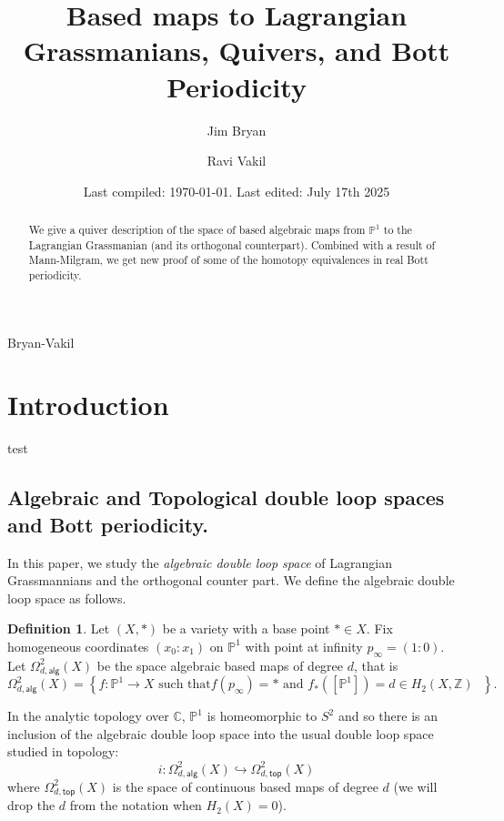 \documentclass{amsart}
\title{Based maps to Lagrangian Grassmanians, Quivers, and Bott Periodicity}
\date{Last compiled:  \today.  Last edited: July 17th 2025}
\author{Jim Bryan}
\author{Ravi Vakil}
\theoremstyle{definition}
\newtheorem{definition}[theorem]{Definition}
\newcommand{\CC} {{\mathbb C}}          %
\newcommand{\ZZ} {{\mathbb Z}}		%
\newcommand{\PP}{\mathbb{P}}
\newcommand{\alg}{\mathsf{alg}}
\renewcommand{\top}{\mathsf{top}}
\newcommand{\LoopTwo}{\Omega^{2}_{d,\alg}}
\newcommand{\LoopTwoTop}{\Omega^{2}_{d,\top}}
\begin{document}
\begin{abstract}
We give a quiver description of the space of based algebraic maps from
$\PP^{1}$ to the Lagrangian Grassmanian (and its orthogonal
counterpart). Combined with a result of Mann-Milgram, we get new proof of some
of the homotopy equivalences in real Bott periodicity.
\end{abstract}

\maketitle 

  {Bryan-Vakil}


\tableofcontents
\pagebreak

\section{Introduction}\label{sec: intro}


test

\subsection{Algebraic and Topological double loop spaces and Bott periodicity.}

In this paper, we study the \emph{algebraic double loop space} of
Lagrangian Grassmannians and the orthogonal counter part. We define the
algebraic double loop space as follows.

\begin{definition}\label{defn: Omega2alg(X)}
Let $(X,*)$ be a variety with a base point $*\in X$. Fix homogeneous
coordinates $(x_{0}:x_{1})$ on $\PP^{1}$ with point at infinity
$p_{\infty}=(1:0)$. Let $\LoopTwo(X)$ be the space algebraic based
maps of degree $d$, that is
\[
\LoopTwo (X) = \left\{f:\PP^{1}\to X\text{ such that
$f(p_{\infty})=*$ and $f_{*}([\PP^{1}])=d\in H_{2}(X,\ZZ )$ } \right\} .
\]
\end{definition}

In the analytic topology over $\CC$, $\PP^{1}$ is homeomorphic to
$S^{2}$ and so there is an inclusion of the algebraic double loop
space into the usual double loop space studied in topology:
\[
i:\LoopTwo (X) \hookrightarrow \LoopTwoTop (X)
\]
where $\LoopTwoTop (X)$ is the space of continuous based maps of
degree $d$ (we will drop the $d$ from the notation when $H_{2}(X)=0$).
\end{document}
